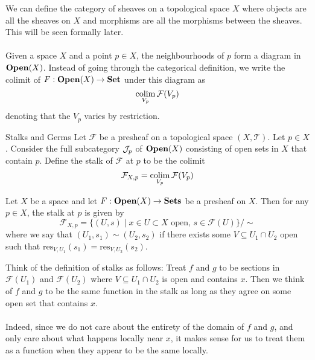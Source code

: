 \documentclass[a4paper]{article}
\begin{document}
We can define the category of sheaves on a topological space $X$ where objects are all the sheaves on $X$ and morphisms are all the morphisms between the sheaves. This will be seen formally later. \\~\\

Given a space $X$ and a point $p\in X$, the neighbourhoods of $p$ form a diagram in $\bold{Open}(X)$. Instead of going through the categorical definition, we write the colimit of $F:\bold{Open}(X)\to\bold{Set}$ under this diagram as $$\operatorname*{colim}_{V_p}\mathcal{F}(V_p)$$ denoting that the $V_p$ varies by restriction. 

\begin{defn}{Stalks and Germs}{} Let $\mathcal{F}$ be a presheaf on a topological space $(X,\mathcal{T})$. Let $p\in X$. Consider the full subcategory $\mathcal{J}_p$ of $\bold{Open}(X)$ consisting of open sets in $X$ that contain $p$. Define the stalk of $\mathcal{F}$ at $p$ to be the colimit $$\mathcal{F}_{X,p}=\operatorname*{colim}_{V_p}\mathcal{F}(V_p)$$ 
\end{defn}

\begin{lmm}{}{} Let $X$ be a space and let $F:\bold{Open}(X)\to\bold{Sets}$ be a presheaf on $X$. Then for any $p\in X$, the stalk at $p$ is given by $$\mathcal{F}_{X,p}=\{(U,s)\;|\;x\in U\subset X\text{ open, }s\in\mathcal{F}(U)\}/\sim$$ where we say that $(U_1,s_1)\sim(U_2,s_2)$ if there exists some $V\subseteq U_1\cap U_2$ open such that $\text{res}_{V,U_1}(s_1)=\text{res}_{V,U_2}(s_2)$. 
\end{lmm}

Think of the definition of stalks as follows: Treat $f$ and $g$ to be sections in $\mathcal{F}(U_1)$ and $\mathcal{F}(U_2)$ where $V\subseteq U_1\cap U_2$ is open and contains $x$. Then we think of $f$ and $g$ to be the same function in the stalk as long as they agree on some open set that contains $x$. \\~\\

Indeed, since we do not care about the entirety of the domain of $f$ and $g$, and only care about what happens locally near $x$, it makes sense for us to treat them as a function when they appear to be the same locally. 
\end{document}
